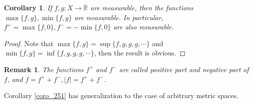 \documentclass[11pt]{book}
\newtheorem{corollary}{Corollary}[theorem]
\newtheorem{remark}{Remark}[chapter]
\theoremstyle{definition}
\numberwithin{equation}{chapter}
\begin{document}
\medskip

\begin{corollary}
If $f,g: X \to \overline{\mathbb{R}}$ are measurable, then the functions $\max\{f,g\}, \min\{f,g\}$ are measurable. In particular, $f^+ = \max\{f,0\}, f^- = - \min\{f,0\}$ are also measurable.
\end{corollary}
\begin{proof}
Note that $\max\{f,g\} = \sup\{f,g,g,g,\cdots\}$ and $\min\{f,g\} = \inf\{f,g,g,g,\cdots\}$, then the result is obvious.
\end{proof}

\medskip

\begin{remark}
The functions $f^+$ and $f^-$ are called positive part and negative part of $f$, and $f = f^+ + f^-, \left|f\right| = f^+ + f^-$.
\end{remark}

\medskip

Corollary \ref{coro_251} has generalization to the case of arbitrary metric spaces.

\medskip
\end{document}
